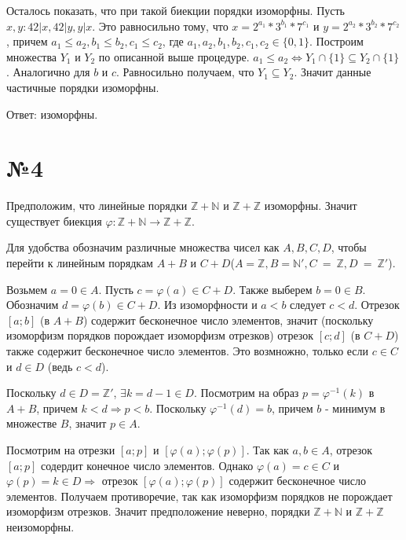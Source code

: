 \documentclass[12pt]{article}
\begin{document}
	Осталось показать, что при такой биекции порядки изоморфны. Пусть $x, y: 42|x, 42 |y, y|x$. Это равносильно тому, что $x=2^{a_1}*3^{b_1}*7^{c_1}$ и $y=2^{a_2}*3^{b_2}*7^{c_2}$,	 причем 
	$a_1 \leqslant a_2	, b_1 \leqslant b_2, c_1 \leqslant c_2$, где $a_1, a_2, b_1, b_2, c_1, c_2 \in \{0, 1\}$. Построим множества $Y_1$ и $Y_2$ по описанной выше процедуре. $a_1 \leqslant a_2 \Leftrightarrow Y_1 \cap \{1\} \subseteq Y_2 \cap \{1\}$. Аналогично для $b$ и $c$. Равносильно получаем, что $Y_1 \subseteq Y_2$. Значит данные частичные порядки изоморфны.
	
	Ответ: изоморфны.
	\section*{№4}	
	Предположим, что линейные порядки $\mathbb{Z} + \mathbb{N}$ и $\mathbb{Z} + \mathbb{Z}$ изоморфны. Значит существует биекция $\varphi:\mathbb{Z} + \mathbb{N} \rightarrow \mathbb{Z} + \mathbb{Z}$.
	
	
	Для удобства обозначим различные множества чисел как $A, B, C, D$, чтобы перейти к линейным порядкам 
	$A + B$ и $C + D$($A = \mathbb{Z}, B = \mathbb{N'}, C~=~\mathbb{Z}, D~=~\mathbb{Z'}$).
	
	Возьмем $a = 0 \in A$. Пусть $c = \varphi(a) \in C + D$. Также выберем $b = 0 \in B$. Обозначим $d = \varphi(b) \in C + D$. Из изоморфности и $a < b$ следует $c < d$. Отрезок $[a; b]$ (в $A + B$) содержит бесконечное число элементов, значит (поскольку изоморфизм порядков порождает изоморфизм отрезков) отрезок 
	$[c; d]$ (в $C + D$) также содержит бесконечное число элементов. Это возмножно, только если $c \in C$ и $d \in D$ (ведь $c < d$).
	
	Поскольку $d \in D = \mathbb{Z'}$, $\exists k = d - 1 \in D$. Посмотрим на образ $p = \varphi^{-1}(k)$  в $A + B$, причем $k < d \Rightarrow p < b$. Поскольку $\varphi^{-1}(d) = b$, причем $b$ - минимум в множестве $B$, значит $p \in A$. 
	
	Посмотрим на отрезки $[a; p]$ и $[\varphi(a); \varphi(p)]$. Так как $a, b \in A$, отрезок $[a; p]$ содердит конечное число элементов. Однако $\varphi(a) = c \in C$ и $\varphi(p) = k \in D \Rightarrow$ отрезок $[\varphi(a); \varphi(p)]$ содержит бесконечное число элементов. Получаем противоречие, так как изоморфизм порядков не порождает изоморфизм отрезков. Значит предположение неверно, порядки $\mathbb{Z} + \mathbb{N}$ и $\mathbb{Z} + \mathbb{Z}$ неизоморфны.		
\end{document}
